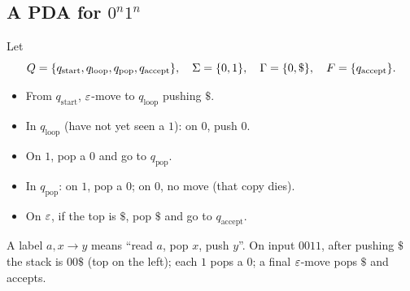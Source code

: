 \subsection{A PDA for \texorpdfstring{$0^n1^n$}{0n1n}}
\begin{example}
Let
\[
  Q=\{q_{\mathrm{start}},q_{\mathrm{loop}},q_{\mathrm{pop}},q_{\mathrm{accept}}\},\quad
  \Sigma=\{0,1\},\quad
  \Gamma=\{0,\mathdollar\},\quad
  F=\{q_{\mathrm{accept}}\}.
\]
\begin{itemize}
  \item From $q_{\mathrm{start}}$, $\varepsilon$-move to $q_{\mathrm{loop}}$ pushing
        $\mathdollar$.
  \item In $q_{\mathrm{loop}}$ (have not yet seen a $1$): on $0$, push $0$.
  \item On $1$, pop a $0$ and go to $q_{\mathrm{pop}}$.
  \item In $q_{\mathrm{pop}}$: on $1$, pop a $0$; on $0$, no move (that copy
        dies).
  \item On $\varepsilon$, if the top is $\mathdollar$, pop $\mathdollar$ and go to $q_{\mathrm{accept}}$.
\end{itemize}
\begin{center}
\end{center}
A label $a,x\to y$ means ``read $a$, pop $x$, push $y$''. On input $0011$,
after pushing $\mathdollar$ the stack is $00\mathdollar$ (top on the left);
each $1$ pops a $0$; a final $\varepsilon$-move pops $\mathdollar$ and accepts.
\end{example}

